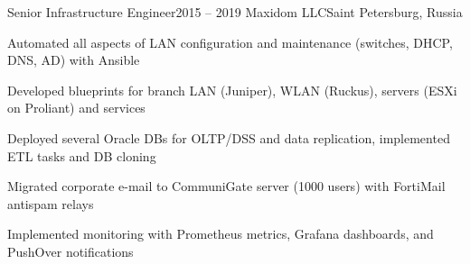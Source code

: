 \expSubHeading
  {Senior Infrastructure Engineer}{2015 -- 2019}
  {Maxidom LLC}{Saint Petersburg, Russia}
\begin{zitemize}
\item Automated all aspects of LAN configuration and maintenance (switches, DHCP, DNS, AD) with Ansible
\item Developed blueprints for branch LAN (Juniper), WLAN (Ruckus), servers (ESXi on Proliant) and services
\item Deployed several Oracle DBs for OLTP/DSS and data replication, implemented ETL tasks and DB cloning
\item Migrated corporate e-mail to CommuniGate server (1000 users) with FortiMail antispam relays
\item Implemented monitoring with Prometheus metrics, Grafana dashboards, and PushOver notifications
\end{zitemize}

